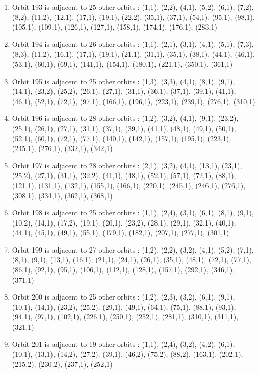 \documentclass[12pt]{article}
\begin{document}
\begin{enumerate}
\item Orbit 193 is adjacent to 25 other orbits : (1,1), (2,2), (4,1), (5,2), (6,1), (7,2), (8,2), (11,2), (12,1), (17,1), (19,1), (22,2), (35,1), (37,1), (54,1), (95,1), (98,1), (105,1), (109,1), (126,1), (127,1), (158,1), (174,1), (176,1), (283,1)
\item Orbit 194 is adjacent to 26 other orbits : (1,1), (2,1), (3,1), (4,1), (5,1), (7,3), (8,3), (11,2), (16,1), (17,1), (19,1), (21,1), (31,1), (35,1), (38,1), (44,1), (46,1), (53,1), (60,1), (69,1), (141,1), (154,1), (180,1), (221,1), (350,1), (361,1)
\item Orbit 195 is adjacent to 25 other orbits : (1,3), (3,3), (4,1), (8,1), (9,1), (14,1), (23,2), (25,2), (26,1), (27,1), (31,1), (36,1), (37,1), (39,1), (41,1), (46,1), (52,1), (72,1), (97,1), (166,1), (196,1), (223,1), (239,1), (276,1), (310,1)
\item Orbit 196 is adjacent to 28 other orbits : (1,2), (3,2), (4,1), (9,1), (23,2), (25,1), (26,1), (27,1), (31,1), (37,1), (39,1), (41,1), (48,1), (49,1), (50,1), (52,1), (60,1), (72,1), (77,1), (140,1), (142,1), (157,1), (195,1), (223,1), (245,1), (276,1), (332,1), (342,1)
\item Orbit 197 is adjacent to 28 other orbits : (2,1), (3,2), (4,1), (13,1), (23,1), (25,2), (27,1), (31,1), (32,2), (41,1), (48,1), (52,1), (57,1), (72,1), (88,1), (121,1), (131,1), (132,1), (155,1), (166,1), (220,1), (245,1), (246,1), (276,1), (308,1), (334,1), (362,1), (368,1)
\item Orbit 198 is adjacent to 25 other orbits : (1,1), (2,4), (3,1), (6,1), (8,1), (9,1), (10,2), (14,1), (17,2), (19,1), (20,1), (23,2), (28,1), (29,1), (32,1), (40,1), (44,1), (45,1), (49,1), (55,1), (179,1), (182,1), (207,1), (277,1), (301,1)
\item Orbit 199 is adjacent to 27 other orbits : (1,2), (2,2), (3,2), (4,1), (5,2), (7,1), (8,1), (9,1), (13,1), (16,1), (21,1), (24,1), (26,1), (35,1), (48,1), (72,1), (77,1), (86,1), (92,1), (95,1), (106,1), (112,1), (128,1), (157,1), (292,1), (346,1), (371,1)
\item Orbit 200 is adjacent to 25 other orbits : (1,2), (2,3), (3,2), (6,1), (9,1), (10,1), (14,1), (23,2), (25,2), (29,1), (49,1), (64,1), (75,1), (88,1), (93,1), (94,1), (97,1), (102,1), (226,1), (250,1), (252,1), (281,1), (310,1), (311,1), (321,1)
\item Orbit 201 is adjacent to 19 other orbits : (1,1), (2,4), (3,2), (4,2), (6,1), (10,1), (13,1), (14,2), (27,2), (39,1), (46,2), (75,2), (88,2), (163,1), (202,1), (215,2), (230,2), (237,1), (252,1)

\end{enumerate}
\end{document}
